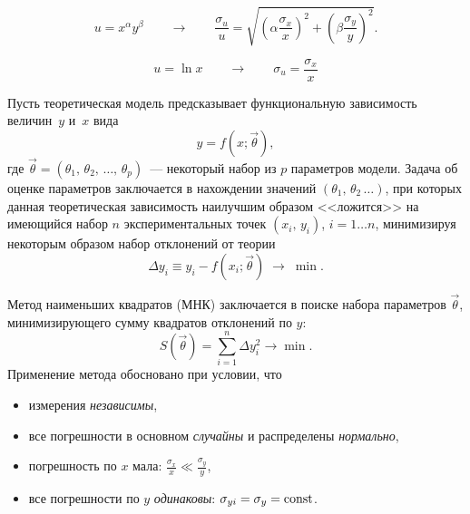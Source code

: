 \begin{booksupplement}
\begin{description}[font=\mdseries\sffamily]
\item[Погрешность степенной функции:]
\[
u = x^{\alpha} y^{\beta} \qquad \to \qquad \frac{\sigma_u}{u} = 
\sqrt{\left(\alpha \frac{\sigma_x}{x}\right)^2 + \left(\beta \frac{\sigma_y}{y}\right)^2}.
\]
\item[Погрешность логарифма:]
\[
u = \ln x \qquad \to \qquad \sigma_u = \frac{\sigma_x}{x}
\]
\end{description}


    
Пусть теоретическая модель предсказывает функциональную зависимость величин~$y$ и~$x$ 
вида 
\[
y=f(x; \vec{\theta}), 
\]
где $\vec{\theta}=(\theta_1,\,\theta_2,\,\ldots,\,\theta_p)$~--- 
некоторый набор из $p$ параметров модели.
Задача об оценке параметров заключается в нахождении значений 
$(\theta_1,\,\theta_2\,\ldots)$, при которых данная теоретическая зависимость 
наилучшим образом <<ложится>> на имеющийся 
набор $n$ экспериментальных точек $(x_i,\,y_i)$, $i=1\ldots n$, 
минимизируя некоторым образом набор отклонений от теории
\[
\Delta y_i \equiv y_i - f(x_i; \vec{\theta}) \;\to \; \min.
\]

    
Метод наименьших квадратов (МНК) заключается в поиске набора параметров $\vec{\theta}$,
минимизирующего сумму квадратов отклонений по $y$:
\[
S(\vec{\theta}) = \sum\limits_{i=1}^n \Delta y_i^2 \to \min.
\]
Применение метода обосновано при условии, что
\begin{itemize}[itemsep=0pt]
    \item измерения \emph{независимы},
    \item все погрешности в основном \emph{случайны} и распределены \emph{нормально},
    \item погрешность по $x$ мала: $\frac{\sigma_{x}}{x} \ll \frac{\sigma_y}{y}$,
    \item все погрешности по $y$ \emph{одинаковы}: $\sigma_{yi} = \sigma_y = \mathrm{const}$.
\end{itemize}


\end{booksupplement}
